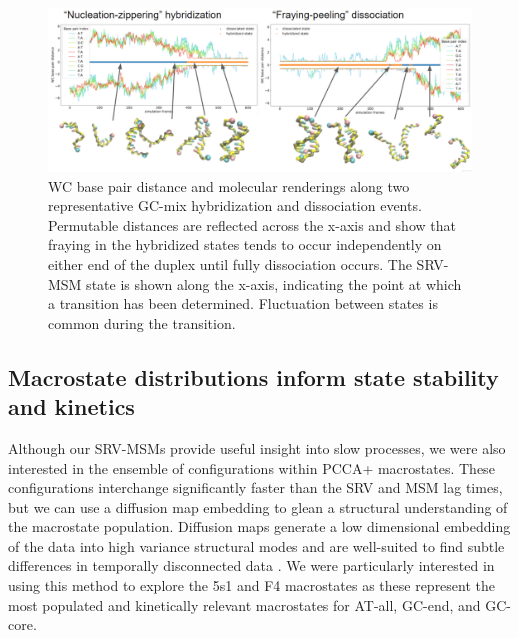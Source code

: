 \documentclass[journal=jpcbfk,manuscript=article]{achemso}
\begin{document}
\begin{figure} %
	\begin{center}
        \includegraphics[width=450, scale=1]{Fig6.pdf}
        \caption{WC base pair distance and molecular renderings along two representative GC-mix hybridization and dissociation events. Permutable distances are reflected across the x-axis and show that fraying in the hybridized states tends to occur independently on either end of the duplex until fully dissociation occurs. The SRV-MSM state is shown along the x-axis, indicating the point at which a transition has been determined. Fluctuation between states is common during the transition.}
        \label{fig:GC-mix_transitions}
	\end{center}
\end{figure}

\subsection{Macrostate distributions inform state stability and kinetics}

Although our SRV-MSMs provide useful insight into slow processes, we were also interested in the ensemble of configurations within PCCA+ macrostates. These configurations interchange significantly faster than the SRV and MSM lag times, but we can use a diffusion map embedding to glean a structural understanding of the macrostate population. Diffusion maps generate a low dimensional embedding of the data into high variance structural modes and are well-suited to find subtle differences in temporally disconnected data \citep{Coifman2006DiffusionMaps, Ferguson2010SystematicMaps}. We were particularly interested in using this method to explore the 5s1 and F4 macrostates as these represent the most populated and kinetically relevant macrostates for AT-all, GC-end, and GC-core.
\end{document}
